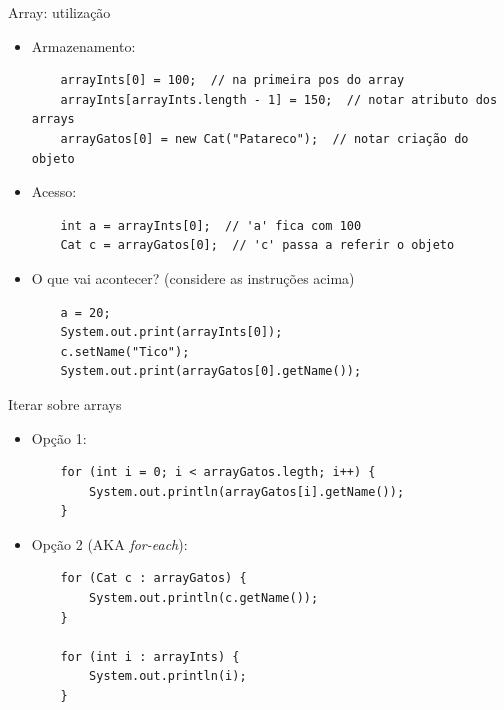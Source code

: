 \documentclass[portuguese, aspectratio=169, xcolor=table]{beamer}
\begin{document}
\begin{frame}[fragile]{Array: utilização}
\begin{itemize}
    \item Armazenamento:
    \begin{verbatim}
    arrayInts[0] = 100;  // na primeira pos do array
    arrayInts[arrayInts.length - 1] = 150;  // notar atributo dos arrays
    arrayGatos[0] = new Cat("Patareco");  // notar criação do objeto
    \end{verbatim}
    \item Acesso:
\begin{verbatim}
    int a = arrayInts[0];  // 'a' fica com 100
    Cat c = arrayGatos[0];  // 'c' passa a referir o objeto
\end{verbatim}
\item O que vai acontecer? (considere as instruções acima)
\begin{verbatim}
    a = 20;
    System.out.print(arrayInts[0]);
    c.setName("Tico");
    System.out.print(arrayGatos[0].getName());
\end{verbatim}
\end{itemize}
\end{frame}


\begin{frame}[fragile]{Iterar sobre arrays}
\begin{itemize}
\item Opção 1:
\begin{verbatim}
    for (int i = 0; i < arrayGatos.legth; i++) {
        System.out.println(arrayGatos[i].getName());
    }
\end{verbatim}
\item Opção 2 (AKA \textit{for-each}):
\begin{verbatim}
    for (Cat c : arrayGatos) {
        System.out.println(c.getName());
    }

    for (int i : arrayInts) {
        System.out.println(i);
    }
\end{verbatim}
\end{itemize}
\end{frame}
\end{document}
